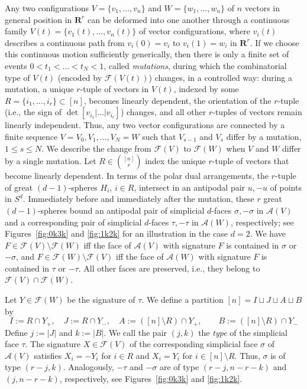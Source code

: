 \documentclass[a4paper,USenglish,cleveref, autoref, thm-restate,nolineno]{socg-lipics-v2021}
\newcommand{\arr}{\mathcal{A}}
\renewcommand{\leq}{\leqslant}
\newcommand{\R}{\mathbf{R}}
\begin{document}
Any two configurations $V=\{v_1,\dots,v_n\}$ and $W=\{w_1,\dots,w_n\}$ of $n$ vectors in general position in $\R^r$ can be deformed into one another through a continuous family $V(t)=\{v_1(t),\dots,v_n(t)\}$ of vector configurations, where $v_i(t)$ describes a continuous path from $v_i(0)=v_i$ to $v_i(1)=w_i$ in $\R^r$. If we choose this continuous motion sufficiently generically, then there is only a finite set of events $0 < t_1 < \dots < t_N < 1$, called \emph{mutations}, during which the combinatorial type of $V(t)$ (encoded by $\mathcal{F}(V(t))$) changes, 
in a controlled way: during a mutation, a unique $r$-tuple of vectors in $V(t)$, indexed by some $R=\{i_1,\dots,i_r\} \subset [n]$, becomes linearly dependent, the orientation of the $r$-tuple (i.e., the sign of 
$\det[v_{i_1}|\dots | v_{i_r}]$) changes, and all other $r$-tuples of vectors remain linearly independent. Thus, any two vector configurations are connected by a finite sequence $V=V_0,V_1,\dots,V_N=W$ such that $V_{s-1}$ and $V_s$ differ by a mutation, $1\leq s\leq N$. 
We describe the change from $\mathcal{F}(V)$ to $\mathcal{F}(W)$ when $V$ and $W$ differ by a single mutation. Let $R\in \binom{[n]}{r}$ index the unique $r$-tuple of vectors that become linearly dependent. In terms of the polar dual arrangements, the $r$-tuple of great $(d-1)$-spheres $H_i$, $i\in R$, intersect in an antipodal pair $u,-u$ of points in $S^d$. Immediately before and immediately after the mutation, these $r$ great $(d-1)$-spheres bound an antipodal pair of simplicial $d$-faces $\sigma,-\sigma$ in $\mathcal{A}(V)$ and a corresponding pair of simplicial $d$-faces $\tau,-\tau$ in $\mathcal{A}(W)$, respectively; see Figures~\ref{fig:0k3k} and \ref{fig:1k2k} for an illustration in the case $d=2$. We have $F\in \mathcal{F}(V)\setminus \mathcal{F}(W)$ iff the face of $\arr(V)$ with signature $F$ is contained in $\sigma$ or $-\sigma$, and $F\in \mathcal{F}(W)\setminus \mathcal{F}(V)$ iff the face of $\arr(W)$  with signature $F$ is contained in $\tau$ or $-\tau$. All other faces are preserved, i.e., they belong to $\mathcal{F}(V) \cap \mathcal{F}(W)$. 

Let $Y\in \mathcal{F}(W)$ be the signature of $\tau$. We define a partition $[n] = I \sqcup J \sqcup A \sqcup B$ by 
\[I:=R \cap Y_+, \quad J:=R \cap Y_-, \quad A:=([n]\setminus R) \cap Y_+ ,\qquad B:=([n]\setminus R) \cap Y_-\]
Define $j:=|J|$ and $k:=|B|$. We call the pair $(j,k)$ the \emph{type} of the simplicial face $\tau$. The signature $X\in \mathcal{F}(V)$ of the corresponding simplicial face $\sigma$ of $\arr(V)$ satisfies $X_i = -Y_i$ for $i \in R$ and $X_i = Y_i$ for $i\in [n]\setminus R$. Thus, $\sigma$ is of type $(r-j,k)$. Analogously, $-\tau$ and $-\sigma$ are of type $(r-j,n-r-k)$ and $(j,n-r-k)$, respectively, see Figures~\ref{fig:0k3k} and \ref{fig:1k2k}. 
\end{document}
